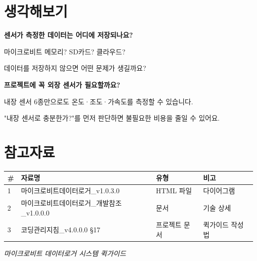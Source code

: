\documentclass[11pt,a4paper]{article}
\begin{document}
\section*{ 생각해보기}

\begin{tcolorbox}[summarybox]
\textbf{센서가 측정한 데이터는 어디에 저장되나요?}

\vspace{0.3em}
마이크로비트 메모리? SD카드? 클라우드?

데이터를 저장하지 않으면 어떤 문제가 생길까요?

\vspace{0.3em}
\textbf{프로젝트에 꼭 외장 센서가 필요할까요?}

\vspace{0.3em}
내장 센서 6종만으로도 온도·조도·가속도를 측정할 수 있습니다.

"내장 센서로 충분한가?"를 먼저 판단하면 불필요한 비용을 줄일 수 있어요.

\end{tcolorbox}


\section*{참고자료}

\begin{center}
\renewcommand{\arraystretch}{1.4}
\begin{tabular}{|p{1.5cm}|p{7.6cm}|p{2.7cm}|p{3.2cm}|}
\hline
\rowcolor{tableheader}
\textbf{\#} & \textbf{자료명} & \textbf{유형} & \textbf{비고} \\
\hline
1 & 마이크로비트데이터로거\_v1.0.3.0 & HTML 파일 & 다이어그램 \\
\hline
2 & 마이크로비트데이터로거\_개발참조\_v1.0.0.0 & 문서 & 기술 상세 \\
\hline
3 & 코딩관리지침\_v4.0.0.0 \S{}17 & 프로젝트 문서 & 퀵가이드 작성법 \\
\hline
\end{tabular}
\end{center}


\vfill
\begin{center}
\small\color{lightbrown}
\textit{마이크로비트 데이터로거 시스템 퀵가이드}
\end{center}
\end{document}
